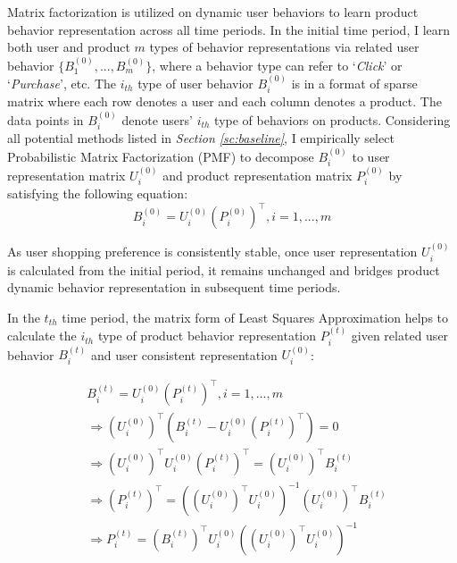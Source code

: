 Matrix factorization is utilized on dynamic user behaviors to learn product behavior representation across all time periods. In the initial time period, I learn both user and product $m$ types of behavior representations via related user behavior $\{B^{(0)}_{1},...,B^{(0)}_{m}\}$, where a behavior type can refer to `\textit{Click}' or `\textit{Purchase}', etc. The $i_{th}$ type of user behavior $B^{(0)}_{i}$ is in a format of sparse matrix where each row denotes a user and each column denotes a product. The data points in $B^{(0)}_{i}$ denote users' $i_{th}$ type of behaviors on products. Considering all potential methods listed in \textit{Section \ref{sc:baseline}}, I empirically select Probabilistic Matrix Factorization (PMF) to decompose $B^{(0)}_{i}$ to user representation matrix $U^{(0)}_{i}$ and product representation matrix $P^{(0)}_{i}$ by satisfying the following equation:
\begin{equation}
B^{(0)}_{i} = U^{(0)}_{i} (P^{(0)}_{i})^\intercal, i = 1,...,m
\end{equation}

As user shopping preference is consistently stable, once user representation $U^{(0)}_{i}$ is calculated from the initial period, it remains unchanged and bridges product dynamic behavior representation in subsequent time periods. 

In the $t_{th}$ time period, the matrix form of Least Squares Approximation helps to calculate the $i_{th}$ type of product behavior representation $P^{(t)}_{i}$ given related user behavior $B^{(t)}_{i}$ and user consistent representation $U^{(0)}_{i}$:
 
\begin{equation}
\begin{aligned} 
& B^{(t)}_{i} = U^{(0)}_{i} (P^{(t)}_{i})^\intercal, i = 1,...,m \\
& \Rightarrow (U^{(0)}_{i})^\intercal (B^{(t)}_{i} - U^{(0)}_{i} (P^{(t)}_{i})^\intercal) = 0 \\
& \Rightarrow (U^{(0)}_{i})^\intercal U^{(0)}_{i} (P^{(t)}_{i})^\intercal = (U^{(0)}_{i})^\intercal B^{(t)}_{i} \\ 
& \Rightarrow (P^{(t)}_{i})^\intercal = (( U^{(0)}_{i})^\intercal U^{(0)}_{i})^{-1}(U^{(0)}_{i})^\intercal B^{(t)}_{i} \\
& \Rightarrow P_{i}^{(t)} = (B_{i}^{(t)})^\intercal U^{(0)}_{i}(( U^{(0)}_{i})^\intercal U^{(0)}_{i})^{-1}
\end{aligned}
\end{equation}



